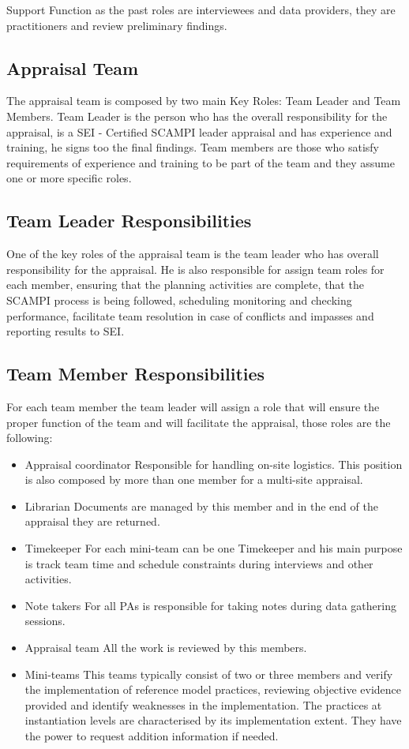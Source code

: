Support Function as the past roles are interviewees and data providers, they are practitioners and review preliminary findings.

\subsection{Appraisal Team}

The appraisal team is composed by two main Key Roles: Team Leader and Team Members.
Team Leader is the person who has the overall responsibility for the appraisal, is a SEI - Certified SCAMPI leader appraisal and has experience and training, he signs too the final findings.
Team members are those who satisfy requirements of  experience and training to be part of the team and they assume one or more specific roles.

\subsection{Team Leader Responsibilities}

One of the key roles of the appraisal team is the team leader who has overall responsibility for the appraisal. He is also responsible for assign team roles for each member, ensuring that the planning activities are complete, that the SCAMPI process is being followed, scheduling monitoring and checking performance, facilitate team resolution in case of conflicts and impasses and reporting results to SEI.

\subsection{Team Member Responsibilities}
For each team member the team leader will assign a role that will ensure the proper function of the team and will facilitate the appraisal, those roles are the following:
\begin{itemize}
	\item Appraisal coordinator
	\subitem Responsible for handling on-site logistics. This position is also composed by more than one member for a multi-site appraisal.
	\item Librarian
	\subitem Documents are managed by this member and in the end of the appraisal they are returned.
	\item Timekeeper
	\subitem For each mini-team can be one Timekeeper and his main purpose is track team time and schedule constraints during interviews and other activities.
	\item Note takers
	\subitem For all PAs is responsible for taking notes during data gathering sessions.
	\item Appraisal team
	\subitem All the work is reviewed by this members.
	\item Mini-teams
	\subitem This teams typically consist of two or three members and verify the implementation of reference model practices, reviewing objective evidence provided and identify weaknesses in the implementation. The practices at instantiation levels are characterised by its implementation extent. They have the power to request addition information if needed. 
\end{itemize}

